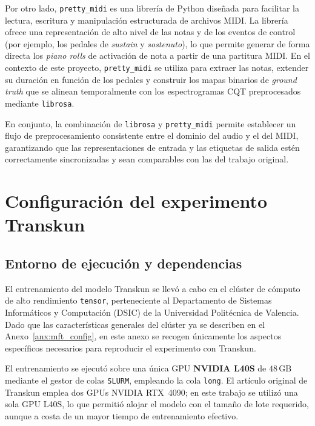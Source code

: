 \documentclass[11pt,spanish,listoffigures,listoftables]{tfgetsinf}
\begin{document}
Por otro lado, \texttt{pretty\_midi} es una librería de Python diseñada para
facilitar la lectura, escritura y manipulación estructurada de archivos MIDI.
La librería ofrece una representación de alto nivel de las notas y de los
eventos de control (por ejemplo, los pedales de \textit{sustain} y
\textit{sostenuto}), lo que permite generar de forma directa los
\textit{piano rolls} de activación de nota a partir de una partitura MIDI.
En el contexto de este proyecto, \texttt{pretty\_midi} se utiliza para extraer
las notas, extender su duración en función de los pedales y construir los mapas
binarios de \textit{ground truth} que se alinean temporalmente con los
espectrogramas CQT preprocesados mediante \texttt{librosa}.

En conjunto, la combinación de \texttt{librosa} y \texttt{pretty\_midi} permite
establecer un flujo de preprocesamiento consistente entre el dominio del audio
y el del MIDI, garantizando que las representaciones de entrada y las etiquetas
de salida estén correctamente sincronizadas y sean comparables con las del
trabajo original.


\chapter{Configuración del experimento Transkun}
\label{anx:transkun_config}

\section{Entorno de ejecución y dependencias}

El entrenamiento del modelo Transkun se llevó a cabo en el clúster de cómputo
de alto rendimiento \texttt{tensor}, perteneciente al Departamento de Sistemas
Informáticos y Computación (DSIC) de la Universidad Politécnica de Valencia.
Dado que las características generales del clúster ya se describen en el
Anexo~\ref{anx:mft_config}, en este anexo se recogen únicamente los aspectos
específicos necesarios para reproducir el experimento con Transkun.

El entrenamiento se ejecutó sobre una única GPU \textbf{NVIDIA L40S} de
$48\,\text{GB}$ mediante el gestor de colas \texttt{SLURM}, empleando la cola
\texttt{long}. El artículo original de Transkun emplea dos GPUs NVIDIA
RTX~4090; en este trabajo se utilizó una sola GPU L40S, lo que permitió alojar
el modelo con el tamaño de lote requerido, aunque a costa de un mayor tiempo de
entrenamiento efectivo.
\end{document}
